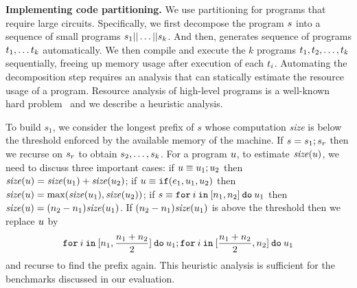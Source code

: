 \noindent\textbf{Implementing code partitioning.}
We use partitioning for programs that require large
circuits. Specifically, we first decompose the program
$s$ into a sequence of small programs
$s_1||\dots||s_k$. And then, \tool generates
sequence of programs $t_1,\dots t_k$ automatically. We then
compile and execute the $k$ programs
$t_1,t_2,\ldots,t_k$ sequentially, freeing up memory
usage after execution of each $t_i$.
Automating the  decomposition step requires an analysis that can 
statically estimate the resource usage of a \tool program.
Resource analysis of high-level programs is a well-known hard problem~\cite{raml}
and we describe a heuristic analysis.

To build $s_1$, we consider the longest
prefix of $s$ whose computation {\it size} is below the threshold enforced by the available memory of the machine.
If $s = s_1; s_r$ then we recurse on $s_r$ to obtain $s_2,\ldots,s_k$.
For a program $u$, to estimate ${\it size}(u)$, we need to discuss three important cases: if $u\equiv u_1;u_2$
then ${\it size}(u)={\it size}(u_1)+{\it size}(u_2)$; if $u\equiv{\ensuremath{\mathtt{if}}}({e_1}, {u_1}, {u_2})$ then ${\it size}(u)=\max({\it size}(u_1),{\it size}(u_2))$; if $s\equiv{\ensuremath{\mathtt{for}}}\:{i}\:{\mathtt{in}}\:[{n_1}, {n_2}]\:{\mathtt{do}}\:{u_1}$ then
${\it size}(u)=(n_2-n_1){\it size}(u_1)$. If $(n_2-n_1){\it size}(u_1)$ is above the threshold then
we replace $u$ by 
\[{\mathtt{for}}\:{i}\:{\mathtt{in}}\:[{n_1}, {\frac{n_1+n_2}{2}}]\:{\mathtt{do}}\:{u_1}; {\mathtt{for}}\:{i}\:{\mathtt{in}}\:[{\frac{n_1+n_2}{2}}, {n_2}]\:{\mathtt{do}}\:{u_1}\]
 and recurse to find the prefix again.
This heuristic analysis is sufficient for the benchmarks discussed in our evaluation.
 


